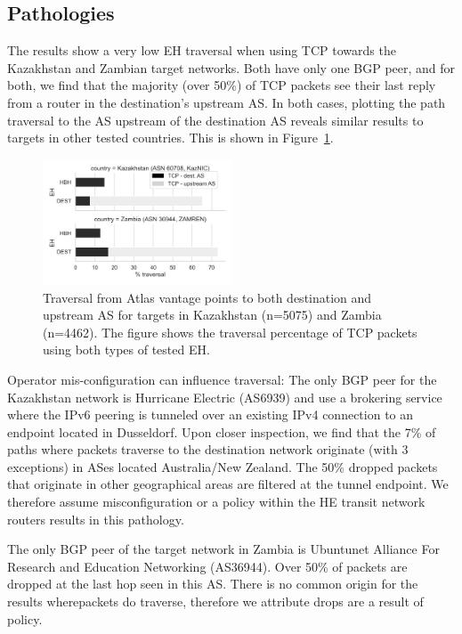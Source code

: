 \documentclass[conference]{IEEEtran}
\begin{document}
\subsection{Pathologies}
    \label{subsec: pathologies}

The results show a very low EH traversal when using TCP towards the Kazakhstan and Zambian target networks. Both have only one BGP peer, and for both, we find that the majority (over 50\%) of TCP packets see their last reply from a router in the destination's upstream AS. In both cases, plotting the path traversal to the AS upstream of the destination AS reveals similar results to targets in other tested countries. This is shown in Figure~\ref{fig:traversal_pathologies}.

\begin{figure}
\centering
  \includegraphics[width=0.5\textwidth]{traversal-pathologies.png}
  \caption{Traversal from Atlas vantage points to both destination and upstream AS for targets in Kazakhstan (n=5075) and Zambia (n=4462). The figure shows the traversal percentage of TCP packets using both types of tested EH.}
  \label{fig:traversal_pathologies}
\end{figure}

Operator mis-configuration can influence traversal: The only BGP peer for the Kazakhstan network is Hurricane Electric (AS6939) and use a  brokering service where the IPv6 peering is tunneled over an existing IPv4 connection to an endpoint located in Dusseldorf. Upon closer inspection, we find that the 7\% of paths where packets traverse to the destination network originate (with 3 exceptions) in ASes located Australia/New Zealand. The 50\% dropped packets that originate in other geographical areas are filtered at the tunnel endpoint. We therefore assume misconfiguration or a policy within the HE transit network routers results in this pathology. 


The only BGP peer of the target network in Zambia is Ubuntunet Alliance For Research and Education Networking (AS36944). Over 50\% of packets are dropped at the last hop seen in this AS. There is no common origin for the results wherepackets do
traverse, therefore we attribute drops are a result of policy. 
\end{document}
